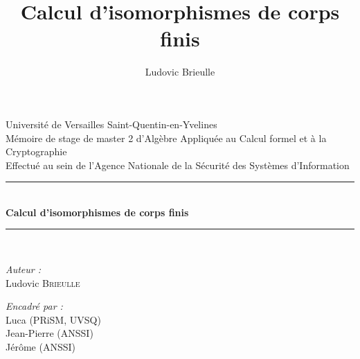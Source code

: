 \documentclass[a4paper]{article} %
\numberwithin{section}{part}
\numberwithin{equation}{section}
\newcommand{\HRule}{\rule{\linewidth}{0.5mm}}
\begin{document}
\title{Calcul d'isomorphismes de corps finis}
\author{Ludovic Brieulle}
\newtheorem{thm}{Théorème}[section]
\newtheorem{lem}[thm]{Lemme}
\newtheorem{cor}[thm]{Corollaire}
\newtheorem{prop}[thm]{Proposition}
\newtheorem{conj}[thm]{Conjecture}
\theoremstyle{definition}
\newtheorem{defn}[thm]{Définition}
\newtheorem{defnp}[thm]{Définition et proposition}
\newtheorem*{ex}{Exemple}
\theoremstyle{remark}
\newtheorem*{rem}{Remarque}

\begin{titlepage}

\begin{center}
\LARGE Université de Versailles Saint-Quentin-en-Yvelines\\[1.5cm] %
\Large Mémoire de stage de master 2 d'Algèbre Appliquée au Calcul formel et à la
Cryptographie\\[0.5cm] %
\large Effectué au sein de l'Agence Nationale de la Sécurité des
Systèmes d'Information\\[0.5cm] %


\HRule \\[0.4cm]
{ \huge \bfseries Calcul d'isomorphismes de corps finis}\\[0.4cm] %
\HRule \\[1cm]
 
\end{center}
\begin{minipage}{0.4\textwidth}
\begin{flushleft} \large
\emph{Auteur :}\\
Ludovic \textsc{Brieulle} %
\end{flushleft}
\end{minipage}
\begin{minipage}{0.5\textwidth}
\begin{flushright} \large
\emph{Encadré par :} \\
Luca  (PRiSM, UVSQ)\\ %
Jean-Pierre  (ANSSI)\\%
Jérôme  (ANSSI)\\%
\end{flushright}
\end{minipage}\\[1cm]


\end{titlepage}
\end{document}
